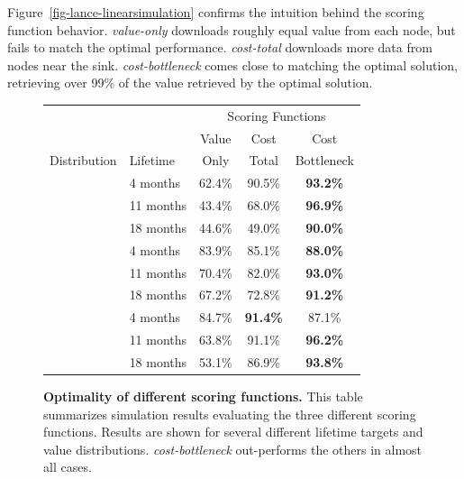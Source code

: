 Figure~\ref{fig-lance-linearsimulation} confirms the intuition behind the
scoring function behavior.  \emph{value-only} downloads roughly equal value
from each node, but fails to match the optimal performance. \emph{cost-total}
downloads more data from nodes near the sink.  \emph{cost-bottleneck} comes
close to matching the optimal solution, retrieving over 99\% of the value
retrieved by the optimal solution.

\begin{figure}[t]
\caption{{\bf Optimality of different scoring functions.} 
This table summarizes simulation results evaluating the three different
scoring functions.  Results are shown for several different lifetime targets
and value distributions.  {\em cost-bottleneck} out-performs the others in
almost all cases.}
\vspace{0.2in}
\begin{center}
\begin{tabular}{llccc}
\noalign{\smallskip}
& & \multicolumn{3}{c}{Scoring Functions} \\
& & Value & Cost & Cost \\
Distribution & Lifetime & Only & Total & Bottleneck \\
\noalign{\smallskip}\svhline\noalign{\smallskip}
\multirow{3}{*}{Uniform} & 4 months & 62.4\% & 90.5\% & \textbf{93.2\%} \\
& 11 months & 43.4\% & 68.0\% & \textbf{96.9\%} \\
& 18 months & 44.6\% & 49.0\% & \textbf{90.0\%} \\
\noalign{\smallskip}\svhline\noalign{\smallskip}
\multirow{3}{*}{Exponential} & 4 months & 83.9\% & 85.1\% & \textbf{88.0\%}
\\
& 11 months & 70.4\% & 82.0\% & \textbf{93.0\%} \\
& 18 months & 67.2\% & 72.8\% & \textbf{91.2\%} \\
\noalign{\smallskip}\svhline\noalign{\smallskip}
\multirow{3}{*}{Zipfian} & 4 months & 84.7\% & \textbf{91.4\%} & 87.1\% \\
& 11 months & 63.8\% & 91.1\% & \textbf{96.2\%} \\
& 18 months & 53.1\% & 86.9\% & \textbf{93.8\%} \\
\end{tabular}
\end{center}
\label{fig-lancetable}
\end{figure}

